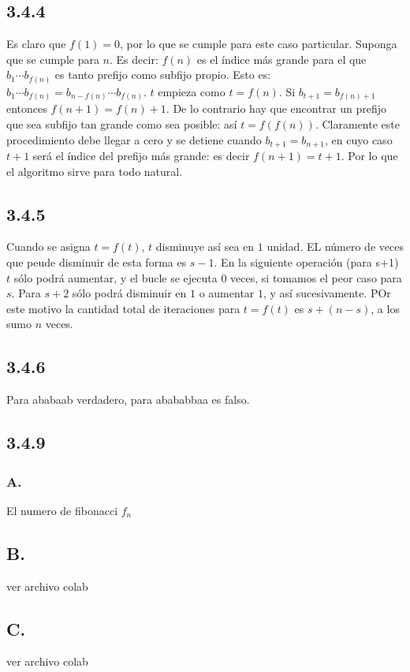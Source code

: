 \documentclass{article}
\begin{document}
\subsection*{3.4.4}
Es claro que $f(1)= 0$, por lo que se cumple para este caso particular. 
Suponga que se cumple para $n$. Es decir: $f(n)$ es el índice más grande para el que $b_1 \cdots b_{f(n)}$ es tanto prefijo como subfijo propio. Esto es: $b_1 \cdots b_{f(n)} = b_{n-f(n)} \cdots b_{f(n)}$. $t$ empieza como $t = f(n)$. Si $b_{t+1} = b_{f(n) + 1}$ entonces $f(n+1) = f(n) + 1$. De lo contrario hay que encontrar un prefijo que sea subfijo tan grande como sea posible: así $t = f(f(n))$. Claramente este procedimiento debe llegar a cero y se detiene cuando $b_{t+1} = b_{n+1}$, en cuyo caso $t+1$ será el índice del prefijo más grande: es decir $f(n+1) = t+1$. Por lo que el algoritmo sirve para todo natural. 

\subsection*{3.4.5}

Cuando se asigna $t = f(t)$, $t$ disminuye así sea en $1$ unidad. EL número de veces que peude disminuir de esta forma es $s-1$. En la siguiente operación (para s+1) $t$ sólo podrá aumentar, y el bucle se ejecuta $0$ veces, si tomamos el peor caso para $s$. Para $s+2$ sólo podrá disminuir en $1$ o aumentar $1$, y así sucesivamente. POr este motivo la cantidad total de iteraciones para $t=f(t)$ es $s+(n-s)$, a los sumo $n$ veces. 
\subsection*{3.4.6}
Para ababaab verdadero, para abababbaa es falso. 
\subsection*{3.4.9}
\subsubsection*{A.}
El numero de fibonacci $f_n$
\subsection*{B.}
ver archivo colab
\subsection*{C.}
ver archivo colab
\end{document}
